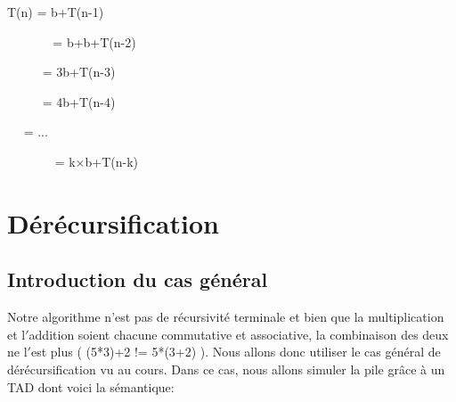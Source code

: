 \documentclass[a4paper, 11pt, oneside]{article}
\begin{document}
\begin{center}
    T(n) = b+T(n-1)
    
    \textcolor{white}{----------} = b+b+T(n-2) 
    
    \textcolor{white}{--------} = 3b+T(n-3) 

    \textcolor{white}{--------} = 4b+T(n-4) 

    \textcolor{white}{---} = ...\textcolor{white}{-------}
    
    \textcolor{white}{-----------} = k$\times$b+T(n-k)

\end{center}

\section{Dérécursification}\label{derecur}


\subsection{Introduction du cas général}


Notre algorithme n'est pas de récursivité terminale et bien que la multiplication 
et l$'$addition soient chacune commutative et associative, la combinaison des 
deux ne l$'$est plus ( (5*3)+2 != 5*(3+2) ). Nous allons donc utiliser le cas
général de dérécursification vu au cours. Dans ce cas, nous allons simuler la pile
grâce à un TAD dont voici la sémantique:\vspace{0.5cm}
\end{document}
